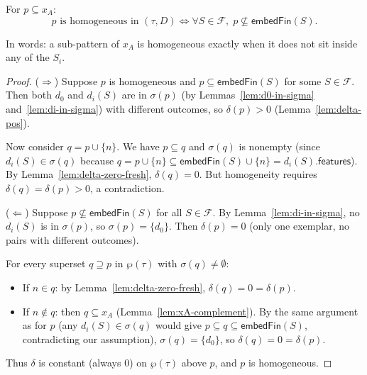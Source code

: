 \begin{theorem}
  \label{thm:homogeneous-iff}
  \leanok
  For $p \subseteq x_A$:
  \[
    p \text{ is homogeneous in } (\tau, D)
    \iff \forall S \in \mathcal{F},\; p \not\subseteq \mathsf{embedFin}(S).
  \]

  In words: a sub-pattern of $x_A$ is homogeneous exactly when it does not sit
  inside any of the $S_i$.

  \begin{proof}
    ($\Rightarrow$) Suppose $p$ is homogeneous and $p \subseteq \mathsf{embedFin}(S)$
    for some $S \in \mathcal{F}$.  Then both $d_0$ and $d_i(S)$ are in $\sigma(p)$
    (by Lemmas~\ref{lem:d0-in-sigma} and~\ref{lem:di-in-sigma}) with different
    outcomes, so $\delta(p) > 0$ (Lemma~\ref{lem:delta-pos}).

    Now consider $q = p \cup \{n\}$.  We have $p \subseteq q$ and $\sigma(q)$ is
    nonempty (since $d_i(S) \in \sigma(q)$ because $q = p \cup \{n\} \subseteq
    \mathsf{embedFin}(S) \cup \{n\} = d_i(S).\mathsf{features}$).
    By Lemma~\ref{lem:delta-zero-fresh}, $\delta(q) = 0$.  But homogeneity
    requires $\delta(q) = \delta(p) > 0$, a contradiction.

    ($\Leftarrow$) Suppose $p \not\subseteq \mathsf{embedFin}(S)$ for all $S \in
    \mathcal{F}$.  By Lemma~\ref{lem:di-in-sigma}, no $d_i(S)$ is in $\sigma(p)$,
    so $\sigma(p) = \{d_0\}$.  Then $\delta(p) = 0$ (only one exemplar, no pairs
    with different outcomes).

    For every superset $q \supseteq p$ in $\wp(\tau)$ with $\sigma(q) \neq
    \emptyset$:
    \begin{itemize}
      \item If $n \in q$: by Lemma~\ref{lem:delta-zero-fresh}, $\delta(q) = 0 =
            \delta(p)$. \cmark
      \item If $n \notin q$: then $q \subseteq x_A$ (Lemma~\ref{lem:xA-complement}).
            By the same argument as for $p$ (any $d_i(S) \in \sigma(q)$ would
            give $p \subseteq q \subseteq \mathsf{embedFin}(S)$, contradicting our
            assumption), $\sigma(q) = \{d_0\}$, so $\delta(q) = 0 = \delta(p)$.
            \cmark
    \end{itemize}
    Thus $\delta$ is constant (always $0$) on $\wp(\tau)$ above $p$, and $p$ is
    homogeneous.
  \end{proof}
\end{theorem}

